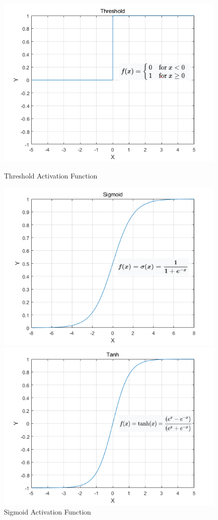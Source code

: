 \documentclass[english,version-2022-01]{uzl-thesis}
\begin{document}
\begin{itemize}
\begin{figure}[htbp]
	\centering
	\begin{minipage}{0.49\linewidth}
		\centering
            \includegraphics[width=0.9\linewidth]{pic/Threshold.png}
            \caption{Threshold Activation Function}
            \label{Threshold}
	\end{minipage}
	\begin{minipage}{0.49\linewidth}
		\centering
		  \includegraphics[width=0.9\linewidth]{pic/Sigmoid.png}
            \caption{Sigmoid Activation Function}
            \label{Sigmoid}
	\end{minipage}
	\begin{minipage}{0.49\linewidth}
		\centering
		  \includegraphics[width=0.9\linewidth]{pic/Tanh.png}

\end{minipage}
\end{figure}
\end{itemize}
\end{document}
